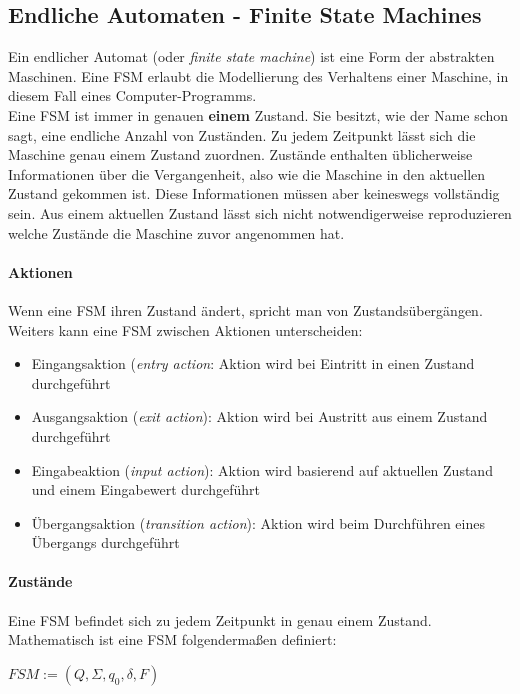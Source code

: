 \subsection{Endliche Automaten - Finite State Machines}
Ein endlicher Automat (oder \textit{finite state machine}) ist eine Form der abstrakten Maschinen. Eine FSM erlaubt die Modellierung des Verhaltens einer Maschine, in diesem Fall eines Computer-Programms.\cite{wagner_modeling_2006}\\
Eine FSM ist immer in genauen \textbf{einem} Zustand. Sie besitzt, wie der Name schon sagt, eine endliche Anzahl von Zuständen. Zu jedem Zeitpunkt lässt sich die Maschine genau einem Zustand zuordnen. Zustände enthalten üblicherweise Informationen über die Vergangenheit, also wie die Maschine in den aktuellen Zustand gekommen ist. Diese Informationen müssen aber keineswegs vollständig sein. Aus einem aktuellen Zustand lässt sich nicht notwendigerweise reproduzieren welche Zustände die Maschine zuvor angenommen hat.\\

\paragraph{Aktionen}
Wenn eine FSM ihren Zustand ändert, spricht man von Zustandsübergängen. Weiters kann eine FSM zwischen Aktionen unterscheiden:
\begin{itemize}
\item Eingangsaktion (\textit{entry action}: Aktion wird bei Eintritt in einen Zustand durchgeführt
\item Ausgangsaktion (\textit{exit action}): Aktion wird bei Austritt aus einem Zustand durchgeführt
\item Eingabeaktion (\textit{input action}): Aktion wird basierend auf aktuellen Zustand und einem Eingabewert durchgeführt
\item Übergangsaktion (\textit{transition action}): Aktion wird beim Durchführen eines Übergangs durchgeführt
\end{itemize}

\paragraph{Zustände}
Eine FSM befindet sich zu jedem Zeitpunkt in genau einem Zustand. Mathematisch ist eine FSM folgendermaßen definiert: 

\begin{center}
$FSM := (Q, \Sigma, q_0, \delta, F)$
\end{center}

